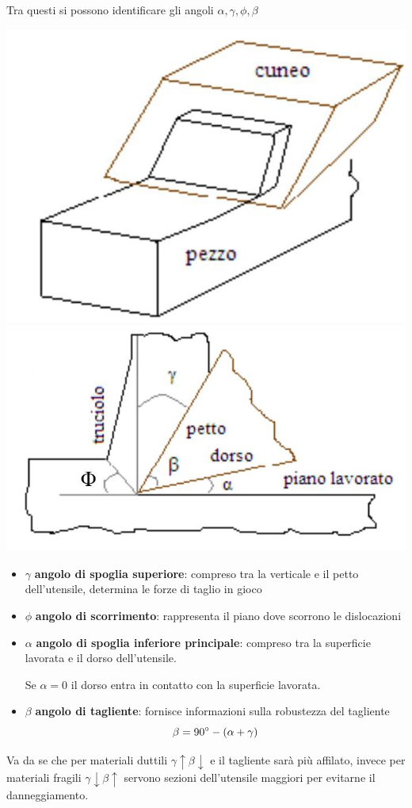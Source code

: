 \documentclass[a4paper, 15pt]{article}
\newcommand{\compresslist}{ %
			\setlength{\itemsep}{1pt}
			\setlength{\parskip}{0pt}
			\setlength{\parsep}{0pt}
		}
\begin{document}
	Tra questi si possono identificare gli angoli $\alpha, \gamma, \phi, \beta$
\begin{center}
	\includegraphics[width=0.4\linewidth]{figures/asp1}
	\includegraphics[width=0.4\linewidth]{figures/asp2}
\end{center}
\begin{itemize}\compresslist
	\item $\gamma$ \textbf{angolo di spoglia superiore}: compreso tra la verticale e il petto dell'utensile, determina le forze di taglio in gioco
	
	\item $\phi$ \textbf{angolo di scorrimento}: rappresenta il piano dove scorrono le dislocazioni
	
	\item $\alpha$ \textbf{angolo di spoglia inferiore principale}: compreso tra la superficie lavorata e il dorso dell'utensile.
	
	Se $\alpha=0$ il dorso entra in contatto con la superficie lavorata. 
	
	\item $\beta$ \textbf{angolo di tagliente}: fornisce informazioni sulla robustezza del tagliente
	\[\beta = 90\degree - (\alpha+\gamma)\]
\end{itemize}
	Va da se che per materiali duttili $\gamma\uparrow\beta\downarrow$ e il tagliente sarà più affilato, invece per materiali fragili $\gamma\downarrow\beta\uparrow$ servono sezioni dell'utensile maggiori per evitarne il danneggiamento.\\
	
\end{document}
